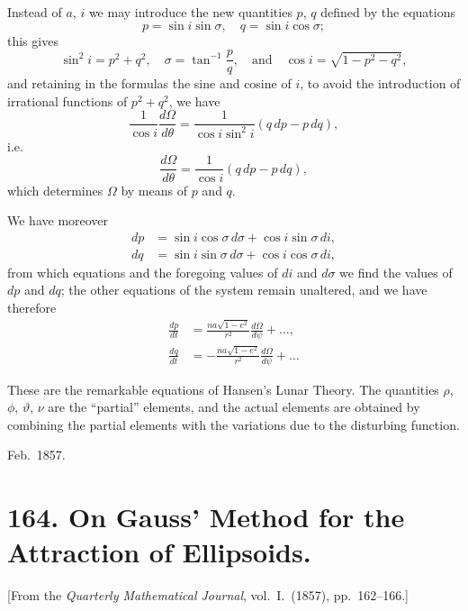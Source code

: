 \documentclass[11pt,a4paper]{book}
\begin{document}
Instead of $a$, $i$ we may introduce the new quantities $p$, $q$ defined by the equations
\[
p = \sin i\sin\sigma, \quad q = \sin i\cos\sigma;
\]
this gives
\[
\sin^2 i = p^2 + q^2, \quad \sigma = \tan^{-1}\frac{p}{q}, \quad \text{and} \quad \cos i = \sqrt{1-p^2-q^2},
\]
and retaining in the formulas the sine and cosine of $i$, to avoid the introduction of irrational functions of $p^2+q^2$, we have
\[
\frac{1}{\cos i}\frac{d\Omega}{d\theta} = \frac{1}{\cos i\sin^2 i}(q\, dp - p\, dq),
\]
i.e.
\[
\frac{d\Omega}{d\theta} = \frac{1}{\cos i}(q\, dp - p\, dq),
\]
which determines $\Omega$ by means of $p$ and $q$.

We have moreover
\begin{align*}
dp &= \sin i\cos\sigma\, d\sigma + \cos i\sin\sigma\, di, \\
dq &= \sin i\sin\sigma\, d\sigma + \cos i\cos\sigma\, di,
\end{align*}
from which equations and the foregoing values of $di$ and $d\sigma$ we find the values of $dp$ and $dq$; the other equations of the system remain unaltered, and we have therefore
\begin{align*}
\frac{dp}{dt} &= \frac{na\sqrt{1-e^2}}{r^2}\frac{d\Omega}{d\psi} + \ldots, \\
\frac{dq}{dt} &= -\frac{na\sqrt{1-e^2}}{r^2}\frac{d\Omega}{d\psi} + \ldots
\end{align*}

These are the remarkable equations of Hansen's Lunar Theory. The quantities $\rho$, $\phi$, $\vartheta$, $\nu$ are the ``partial'' elements, and the actual elements are obtained by combining the partial elements with the variations due to the disturbing function.

\begin{flushright}
Feb.~1857.
\end{flushright}

\clearpage

\section*{164. On Gauss' Method for the Attraction of Ellipsoids.}

[From the \textit{Quarterly Mathematical Journal}, vol.~I.\ (1857), pp.~162--166.]
\end{document}

